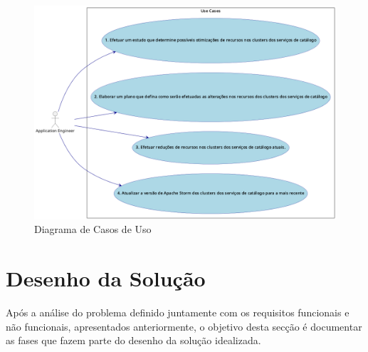 \begin{figure}[H]
  \centerline{\includegraphics[scale=0.4]{media/content/analise/ucd.png}}
  \caption{Diagrama de Casos de Uso}
  \label{dcu}
\end{figure}

\section{Desenho da Solução}

Após a análise do problema definido juntamente com os requisitos funcionais e não funcionais,
apresentados anteriormente, o objetivo desta secção é documentar as fases que fazem parte do
desenho da solução idealizada.


